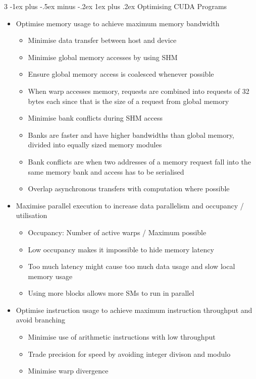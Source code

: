 \documentclass[10pt, landscape]{article}
\makeatletter
\renewcommand{\subsection}{\@startsection{subsection}{3}{0mm}%
                                {-1ex plus -.5ex minus -.2ex}%
                                {1ex plus .2ex}%
                                {\normalfont\small\bfseries}}%
\makeatother
\begin{document}
\begin{multicols*}{3}
\subsection{Optimising CUDA Programs}
\begin{itemize}
    \item Optimise memory usage to achieve maximum memory bandwidth
    \begin{itemize}
        \item Minimise data transfer between host and device
        \item Minimise global memory accesses by using SHM
        \item Ensure global memory access is coalesced whenever possible
        \item When warp accesses memory, requests are combined into requests of 32 bytes each since that is the size of a request from global memory
        \item Minimise bank conflicts during SHM access
        \item Banks are faster and have higher bandwidths than global memory, divided into equally sized memory modules
        \item Bank conflicts are when two addresses of a memory request fall into the same memory bank and access has to be serialised
        \item Overlap asynchronous transfers with computation where possible
    \end{itemize}
    \item Maximise parallel execution to increase data parallelism and occupancy / utilisation
    \begin{itemize}
        \item Occupancy: Number of active warps / Maximum possible
        \item Low occupancy makes it impossible to hide memory latency
        \item Too much latency might cause too much data usage and slow local memory usage
        \item Using more blocks allows more SMs to run in parallel
    \end{itemize}
    \item Optimise instruction usage to achieve maximum instruction throughput and avoid branching
    \begin{itemize}
        \item Minimise use of arithmetic instructions with low throughput
        \item Trade precision for speed by avoiding integer divison and modulo
        \item Minimise warp divergence
    \end{itemize}
\end{itemize}


\end{multicols*}
\end{document}
